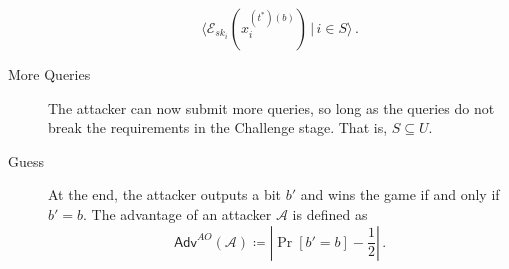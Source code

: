 \documentclass[twocolumn]{autart}
\begin{document}
\begin{description}
\begin{equation*}
        \langle\mathcal{E}_{sk_i}(x^{(t^*)(b)}_i)\,|\,i\in S\rangle\,.
    \end{equation*}
    \item[More Queries] The attacker can now submit more queries, so long as the queries do not break the requirements in the Challenge stage. That is, $S \subseteq U$.
    \item[Guess] At the end, the attacker outputs a bit $b'$ and wins the game if and only if $b' = b$. The advantage of an attacker $\mathcal{A}$ is defined as
    \begin{equation*}
        \mathsf{Adv}^{AO}(\mathcal{A}) \coloneqq \left\lvert \Pr [b'=b] - \frac{1}{2}\right\rvert\,.
    \end{equation*} 
\end{description}
\end{document}
